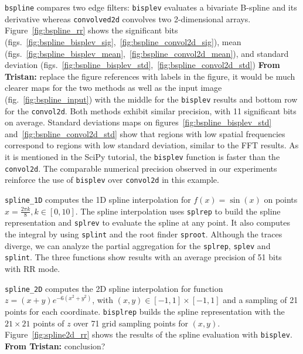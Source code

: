 \documentclass[11pt]{article}
\newcommand{\tristan}[1]{\color{orange}\textbf{From Tristan:} #1\color{black}\xspace}
\begin{document}
\texttt{bspline} compares two edge filters: \texttt{bisplev} evaluates a bivariate B-spline and its derivative whereas \texttt{convolved2d} convolves two 2-dimensional arrays. Figure~\ref{fig:bspline_rr}
shows the significant bits (figs.~\ref{fig:bspline_bisplev_sig},~\ref{fig:bspline_convol2d_sig}), 
mean (figs.~\ref{fig:bspline_bisplev_mean},~\ref{fig:bspline_convol2d_mean}), and standard deviation (figs.~\ref{fig:bspline_bisplev_std},~\ref{fig:bspline_convol2d_std}) \tristan{replace the figure references with labels in the figure, it would be much clearer} maps for the two methods as well as the input image (fig.~\ref{fig:bspline_input}) with the middle for the \texttt{bisplev} results and bottom row for the \texttt{convol2d}. Both methods exhibit similar precision, with 11 significant bits on average. Standard deviations maps on figures~\ref{fig:bspline_bisplev_std} and~\ref{fig:bspline_convol2d_std} show that regions with low spatial frequencies correspond to regions with low standard deviation, similar to the FFT results. As it is mentioned in the SciPy tutorial, the \texttt{bisplev} function is faster than the \texttt{convol2d}. The comparable numerical precision observed in our experiments reinforce the use of \texttt{bisplev} over \texttt{convol2d} in this example.

\texttt{spline\_1D} computes the 1D spline interpolation for $f(x)=\sin(x)$ on points $x=\frac{2\pi k}{8}, k \in [0, 10]$. The spline interpolation uses \texttt{splrep} to build the spline representation and \texttt{splrev} to evaluate the spline at any point. It also computes the integral by using \texttt{splint} and the root finder \texttt{sproot}. Although the traces diverge, we can analyze the partial aggregation for the \texttt{splrep}, \texttt{splev} and \texttt{splint}. The three functions show results with an average precision of 51 bits with RR mode.
 
\texttt{spline\_2D} computes the 2D spline interpolation for function $z=(x+y)e^{-6(x^2+y^2)}$, with $(x,y) \in [-1,1]\times[-1,1]$ and a sampling of 21 points for each coordinate. \texttt{bisplrep} builds the spline representation with the $21 \times 21$ points of $z$ over 71 grid sampling points for $(x,y)$. Figure~\ref{fig:spline2d_rr} shows the results of the spline evaluation with \texttt{bisplev}. \tristan{conclusion?} 


\end{document}
